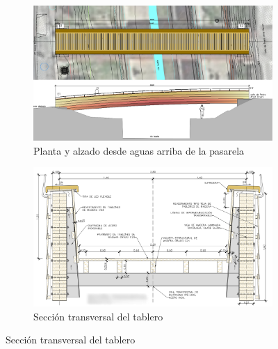 \documentclass[a4paper,11pt ]{xc_webpage_project}
\renewcommand{\widhtLeftCol}{0.50\textwidth} %
\renewcommand{\widhtRightCol}{0.45\textwidth} %
\begin{document}
\begin{figure}[h]
  \begin{subfigure}[l]{\widhtLeftCol}
  \centering
  \includegraphics[width=\textwidth]{figures/planta_alzado}
  \caption{Planta y alzado desde aguas arriba de la pasarela}
  \end{subfigure}
\hfill
  \begin{subfigure}[r]{\widhtRightCol}
  \centering
  \includegraphics[width=\textwidth]{figures/sec_transv}
  \caption{Sección transversal del tablero}
  \end{subfigure}
  \end{figure}
\end{document}
